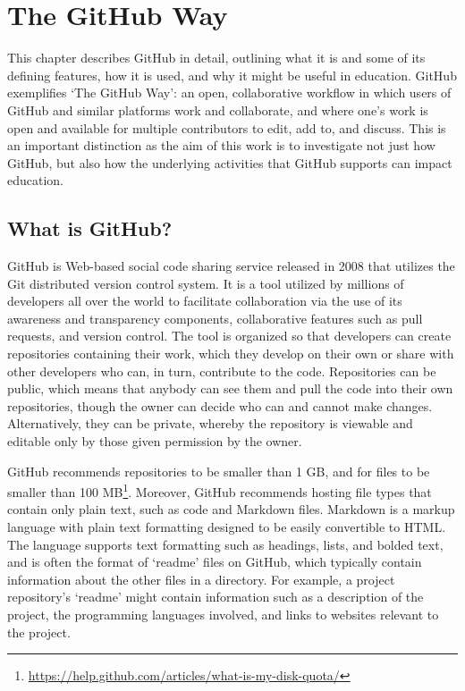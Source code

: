 \chapter{The GitHub Way}
This chapter describes GitHub in detail, outlining what it is and some of its defining features, how it is used, and why it might be useful in education. GitHub exemplifies `The GitHub Way': an open, collaborative workflow in which users of GitHub and similar platforms work and collaborate, and where one's work is open and available for multiple contributors to edit, add to, and discuss. This is an important distinction as the aim of this work is to investigate not just how GitHub, but also how the underlying activities that GitHub supports can impact education. %

\section{What is GitHub?}
GitHub is Web-based social code sharing service released in 2008 that utilizes the Git distributed version control system. It is a tool utilized by millions of developers all over the world to facilitate collaboration via the use of its awareness and transparency components, collaborative features such as pull requests, and version control. The tool is organized so that developers can create repositories containing their work, which they develop on their own or share with other developers who can, in turn, contribute to the code. Repositories can be public, which means that anybody can see them and pull the code into their own repositories, though the owner can decide who can and cannot make changes. Alternatively, they can be private, whereby the repository is viewable and editable only by those given permission by the owner.

GitHub recommends repositories to be smaller than 1 GB, and for files to be smaller than 100 MB\footnote{\url{https://help.github.com/articles/what-is-my-disk-quota/}}. Moreover, GitHub recommends hosting file types that contain only plain text, such as code and Markdown files. Markdown is a markup language with plain text formatting designed to be easily convertible to HTML. The language supports text formatting such as headings, lists, and bolded text, and is often the format of `readme' files on GitHub, which typically contain information about the other files in a directory. For example, a project repository's `readme' might contain information such as a description of the project, the programming languages involved, and links to websites relevant to the project.

